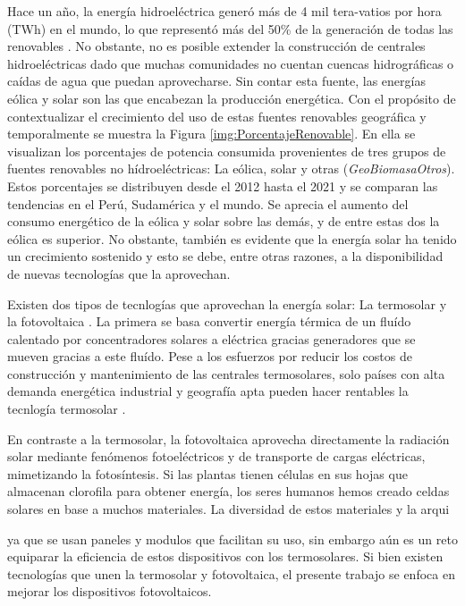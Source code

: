 Hace un año, la energía hidroeléctrica generó más de 4 mil tera-vatios por hora (TWh) en el mundo, lo que representó más del 50\% de la generación de todas las renovables \cite{irena2022international}. No obstante, no es posible extender la construcción de centrales hidroeléctricas dado que muchas comunidades no cuentan cuencas hidrográficas o caídas de agua que puedan aprovecharse. Sin contar esta fuente, las energías eólica y solar son las que encabezan la producción energética. Con el propósito de contextualizar el crecimiento del uso de estas fuentes renovables geográfica y temporalmente se muestra la Figura \ref{img:PorcentajeRenovable}. En ella se visualizan los porcentajes de potencia consumida provenientes de tres grupos de fuentes renovables no hídroeléctricas: La eólica, solar y otras (\textit{GeoBiomasaOtros}). Estos porcentajes se distribuyen desde el 2012 hasta el 2021 y se comparan las tendencias en el Perú, Sudamérica y el mundo. Se aprecia el aumento del consumo energético de la eólica y solar sobre las demás, y de entre estas dos la eólica es superior. No obstante, también es evidente que la energía solar ha tenido un crecimiento sostenido y esto se debe, entre otras razones, a la disponibilidad de nuevas tecnologías que la aprovechan.



Existen dos tipos de tecnlogías que aprovechan la energía solar: La termosolar y la fotovoltaica \cite{hammarstrom2012}. La primera se basa convertir energía térmica de un fluído calentado por concentradores solares a eléctrica gracias generadores que se mueven gracias a este fluído. Pese a los esfuerzos por reducir los costos de construcción y mantenimiento de las centrales termosolares, solo países con alta demanda energética industrial y geografía apta pueden hacer rentables la tecnlogía termosolar \cite{xu2022concentrated}.

En contraste a la termosolar, la fotovoltaica aprovecha directamente la radiación solar mediante fenómenos fotoeléctricos y de transporte de cargas eléctricas, mimetizando la fotosíntesis. Si las plantas tienen células en sus hojas que almacenan clorofila para obtener energía, los seres humanos hemos creado celdas solares en base a muchos materiales. La diversidad de estos materiales y la arqui

ya que se usan paneles y modulos que facilitan su uso, sin embargo aún es un reto equiparar la eficiencia de estos dispositivos con los termosolares. Si bien existen tecnologías que unen la termosolar y fotovoltaica, el presente trabajo se enfoca en mejorar los dispositivos fotovoltaicos.

